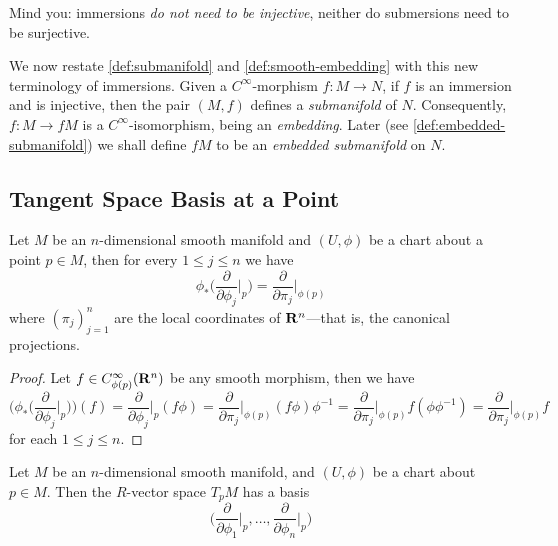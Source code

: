 \begin{remark}
\label{rem:immersion-submersion-not-injective-not-surjective}
Mind you: immersions \emph{do not need to be injective}, neither do
submersions need to be surjective.
\end{remark}

We now restate \cref{def:submanifold} and \cref{def:smooth-embedding} with this
new terminology of immersions. Given a \(C^{\infty}\)-morphism \(f: M \to N\),
if \(f\) is an immersion and is injective, then the pair \((M, f)\) defines a
\emph{submanifold} of \(N\). Consequently, \(f: M \to f M\) is a
\(C^\infty\)-isomorphism, being an \emph{embedding}. Later (see
\cref{def:embedded-submanifold}) we shall define \(f M\) to be an \emph{embedded
  submanifold} on \(N\).

\subsection{Tangent Space Basis at a Point}

\begin{lemma}
\label{lem:tangent-space-basis-lemma}
Let \(M\) be an \(n\)-dimensional smooth manifold and \((U, \phi)\) be a chart
about a point \(p \in M\), then for every \(1 \leq j \leq n\) we have
\[
\phi_{*}\Big( \frac{\partial}{\partial \phi_j}\Big|_p \Big)
= \frac{\partial}{\partial \pi_j} \Big|_{\phi(p)}
\]
where \((\pi_j)_{j=1}^n\) are the local coordinates of \(\mathbf{R}^n\)---that is, the
canonical projections.
\end{lemma}

\begin{proof}
Let \(f \in C_{\phi(p)}^{\infty}(\mathbf{R}^n)\) be any smooth morphism, then we have
\[
\Big( \phi_{*} \Big( \frac{\partial}{\partial \phi_j} \Big|_p \Big) \Big) (f)
= \frac{\partial}{\partial \phi_j}\Big|_p (f \phi)
= \frac{\partial}{\partial \pi_j}\Big|_{\phi(p)} (f \phi) \phi^{-1}
= \frac{\partial}{\partial \pi_j}\Big|_{\phi(p)} f (\phi \phi^{-1})
= \frac{\partial}{\partial \pi_j}\Big|_{\phi(p)} f
\]
for each \(1 \leq j \leq n\).
\end{proof}

\begin{proposition}
\label{prop:tangent-space-basis}
Let \(M\) be an \(n\)-dimensional smooth manifold, and \((U, \phi)\) be a chart
about \(p \in M\). Then the \(R\)-vector space \(T_p M\) has a basis
\[
\Big( \frac{\partial}{\partial \phi_1}\Big|_p, \dots,
\frac{\partial}{\partial \phi_n}\Big|_p \Big)
\]
\end{proposition}

